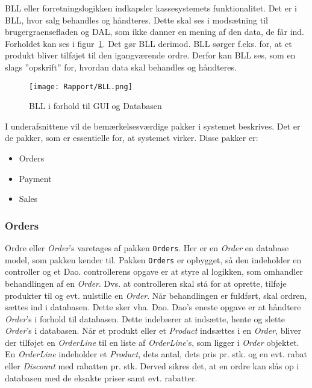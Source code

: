 \gls{BLL} eller \gls{forretningslogik}ken indkapsler kassesystemets funktionalitet. Det er i \gls{BLL}, hvor salg behandles og håndteres. Dette skal ses i modsætning til \Gls{brugergraenseflade}n og \gls{DAL}, som ikke danner en mening af den data, de får ind. Forholdet kan ses i figur~\ref{fig:bll}. Det gør \gls{BLL} derimod. \gls{BLL} sørger f.eks. for, at et produkt bliver tilføjet til den igangværende ordre. Derfor kan \gls{BLL} ses, som en slags ''opskrift'' for, hvordan data skal behandles og håndteres.

\begin{figure}[H]
	\centering
	\texttt{[image: Rapport/BLL.png]}
	\caption{BLL i forhold til GUI og Databasen}
	\label{fig:bll}
\end{figure}

I underafsnittene vil de bemærkelsesværdige pakker i systemet beskrives. Det er de pakker, som er essentielle for, at systemet virker. Disse pakker er:
\begin{itemize}
	\item Orders
	\item Payment
	\item Sales
\end{itemize}

\subsubsection{Orders}
Ordre eller \textit{Order}'s varetages af pakken \texttt{Orders}. Her er en \textit{Order} en database model, som pakken kender til. Pakken \texttt{Orders} er opbygget, så den indeholder en \Gls{controller} og et \gls{Dao}. \Gls{controller}ens opgave er at styre al logikken, som omhandler behandlingen af en \textit{Order}. Dvs. at \gls{controller}en skal stå for at oprette, tilføje produkter til og evt. nulstille en \textit{Order}. Når behandlingen er fuldført, skal ordren, sættes ind i databasen. Dette sker vha. \gls{Dao}. \gls{Dao}'s eneste opgave er at håndtere \textit{Order}'s i forhold til databasen. Dette indebærer at indsætte, hente og slette \textit{Order}'s i databasen.
\newline\newline
Når et produkt eller et \textit{Product} indsættes i en \textit{Order}, bliver der tilføjet en \textit{OrderLine} til en liste af \textit{OrderLine}'s, som ligger i \textit{Order} objektet. En \textit{OrderLine} indeholder et \textit{Product}, dets antal, dets pris pr. stk. og en evt. rabat eller \textit{Discount} med rabatten pr. stk. Derved sikres det, at en ordre kan slås op i databasen med de eksakte priser samt evt. rabatter.

